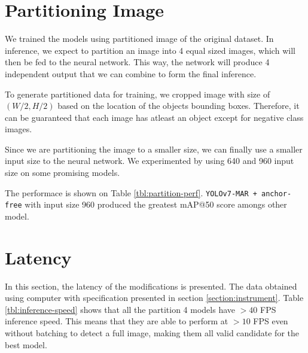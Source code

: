 \begin{table}[H]
  \centering
  \label{tbl:anchorfree_perf}
  \vspace{-1ex}
  
\end{table}


\section{Partitioning Image}
We trained the models using partitioned image of the original dataset.
In inference, we expect to partition an image into 4 equal sized images, which will
then be fed to the neural network. This way, the network will produce 4 independent
output that we can combine to form the final inference.

To generate partitioned data for training, we cropped image with size of $(W/2,H/2)$
based on the location of the objects bounding boxes. Therefore, it can be guaranteed that each image has atleast
an object except for negative class images.

Since we are partitioning the image to a smaller size, we can finally use a smaller input size 
to the neural network. We experimented by using 640 and 960 input size on some promising models.

The performace is shown on Table \ref{tbl:partition-perf}.
\verb|YOLOv7-MAR + anchor-free| with input size 960 produced the greatest mAP@50 score
amongs other model.


\begin{table}[H]
  \centering
  \label{tbl:partition-perf}
  \vspace{-1ex}
  
\end{table}

\section{Latency}
In this section, the latency of the modifications is presented.
The data obtained using computer with specification presented in section \ref{section:instrument}.
Table \ref{tbl:inference-speed} shows that all the partition 4 models have $> 40$ FPS inference speed.
This means that they are able to perform at $>10$ FPS even without batching to detect a full image, making them all valid candidate for the best model.


\begin{table}[H]
  \centering
  \label{tbl:inference-speed}
  \vspace{-1ex}
  \begin{adjustbox}{width=\textwidth}
  
  \end{adjustbox}

\end{table}

